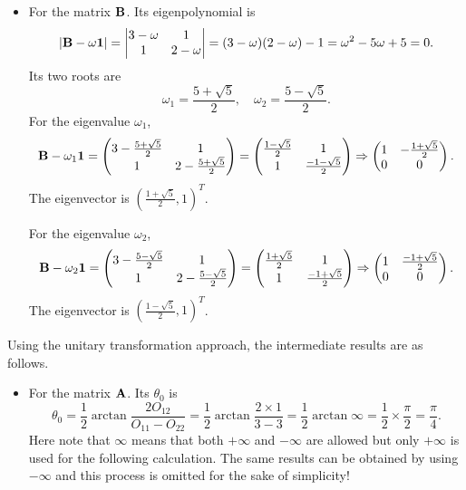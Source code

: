 \documentclass[a4paper]{book}
\newcounter{solution}[chapter]
\newcommand{\A}{{\bf A}}
\newcommand{\B}{{\bf B}}
\newcommand{\I}{{\bf 1}}
\begin{document}
\begin{solution}
\begin{itemize}
	\item For the matrix $\B$. Its eigenpolynomial is
	\begin{align*}
		| \B - \omega \I | = \begin{vmatrix}
			3 - \omega & 1 \\ 1 & 2 - \omega 
		\end{vmatrix} = ( 3 - \omega )( 2 - \omega ) - 1 = \omega^2 - 5 \omega + 5 = 0.
	\end{align*}
	Its two roots are
	\[
		\omega_1 = \frac{ 5 + \sqrt{5} }{2} , \quad \omega_2 = \frac{ 5 - \sqrt{5} }{2} .
	\]
	For the eigenvalue $\omega_1$,
	\[
		\B - \omega_1 \I = \begin{pmatrix}
			3 - \frac{ 5 + \sqrt{5} }{2} & 1 \\ 1 & 2 - \frac{ 5 + \sqrt{5} }{2}
		\end{pmatrix} = \begin{pmatrix}
			\frac{ 1 - \sqrt{5} }{2} & 1 \\ 1 & \frac{ - 1 - \sqrt{5} }{2}
		\end{pmatrix} \Rightarrow \begin{pmatrix}
			1 & - \frac{ 1 + \sqrt{5} }{2} \\ 0 & 0
		\end{pmatrix} .
	\]
	The eigenvector is $( \frac{ 1 + \sqrt{5} }{2} , 1 )^T$.
	
	For the eigenvalue $\omega_2$,
	\[
		\B - \omega_2 \I = \begin{pmatrix}
			3 - \frac{ 5 - \sqrt{5} }{2} & 1 \\ 1 & 2 - \frac{ 5 - \sqrt{5} }{2}
		\end{pmatrix} = \begin{pmatrix}
			\frac{ 1 + \sqrt{5} }{2} & 1 \\ 1 & \frac{ -1 + \sqrt{5} }{2}
		\end{pmatrix} \Rightarrow \begin{pmatrix}
			1 & \frac{ -1 + \sqrt{5} }{2} \\ 0 & 0
		\end{pmatrix} .
	\]
	The eigenvector is $( \frac{ 1 - \sqrt{5} }{2} , 1 )^T$.
	
	\end{itemize}
	
	Using the unitary transformation approach, the intermediate results are as follows.
	\begin{itemize}
	
	\item For the matrix $\A$. Its $\theta_0$ is
	\[
		\theta_0 = \frac{1}{2} \arctan{\frac{ 2O_{12} }{ O_{11} - O_{22} } } = \frac{1}{2} \arctan{ \frac{ 2 \times 1 }{ 3 - 3 } } = \frac{1}{2} \arctan{ \infty } = \frac{1}{2} \times \frac{ \pi }{ 2 } = \frac{ \pi }{ 4 } .
	\]
	Here note that $\infty$	means that both $+\infty$ and $-\infty$ are allowed but only $+\infty$ is used for the following calculation. The same results can be obtained by using $-\infty$ and this process is omitted for the sake of simplicity!
	

\end{itemize}
\end{solution}
\end{document}

